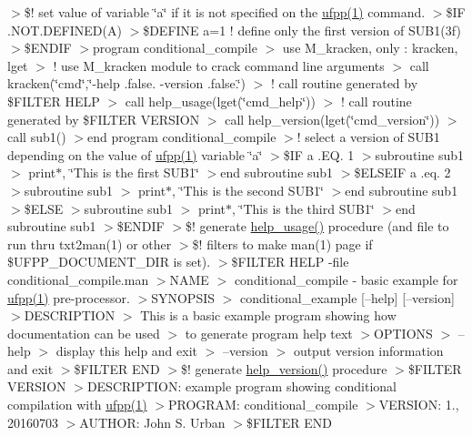 $>$\$! set value of variable \char`\"{}a\char`\"{} if it is not specified on the \hyperlink{ufpp__overview_81_8txt_a97c20a96bcab81bc74c9d64b001f1202}{ufpp(1)} command. $>$\$\+IF .N\+O\+T.\+D\+E\+F\+I\+N\+E\+D(\+A) $>$\$\+D\+E\+F\+I\+NE a=1 ! define only the first version of S\+U\+B1(3f) $>$\$\+E\+N\+D\+IF $>$program conditional\+\_\+compile $>$ use M\+\_\+kracken, only \+: kracken, lget $>$ ! use M\+\_\+kracken module to crack command line arguments $>$ call kracken(\char`\"{}cmd\char`\"{},\char`\"{}-\/help .\+false. -\/version .\+false.\char`\"{}) $>$ ! call routine generated by \$\+F\+I\+L\+T\+ER H\+E\+LP $>$ call help\+\_\+usage(lget(\char`\"{}cmd\+\_\+help\char`\"{})) $>$ ! call routine generated by \$\+F\+I\+L\+T\+ER V\+E\+R\+S\+I\+ON $>$ call help\+\_\+version(lget(\char`\"{}cmd\+\_\+version\char`\"{})) $>$ call sub1() $>$end program conditional\+\_\+compile $>$! select a version of S\+U\+B1 depending on the value of \hyperlink{ufpp__overview_81_8txt_a97c20a96bcab81bc74c9d64b001f1202}{ufpp(1)} variable \char`\"{}a\char`\"{} $>$\$\+IF a .EQ. 1 $>$subroutine sub1 $>$ print$\ast$, \char`\"{}\+This is the first S\+U\+B1\char`\"{} $>$end subroutine sub1 $>$\$\+E\+L\+S\+E\+IF a .eq. 2 $>$subroutine sub1 $>$ print$\ast$, \char`\"{}\+This is the second S\+U\+B1\char`\"{} $>$end subroutine sub1 $>$\$\+E\+L\+SE $>$subroutine sub1 $>$ print$\ast$, \char`\"{}\+This is the third S\+U\+B1\char`\"{} $>$end subroutine sub1 $>$\$\+E\+N\+D\+IF $>$\$! generate \hyperlink{namespacem__fpp_a17c5179799e6700fe39fb3bd2ec85d01}{help\+\_\+usage()} procedure (and file to run thru txt2man(1) or other $>$\$! filters to make man(1) page if \$\+U\+F\+P\+P\+\_\+\+D\+O\+C\+U\+M\+E\+N\+T\+\_\+\+D\+IR is set). $>$\$\+F\+I\+L\+T\+ER H\+E\+LP -\/file conditional\+\_\+compile.\+man $>$N\+A\+ME $>$ conditional\+\_\+compile -\/ basic example for \hyperlink{ufpp__overview_81_8txt_a97c20a96bcab81bc74c9d64b001f1202}{ufpp(1)} pre-\/processor. $>$S\+Y\+N\+O\+P\+S\+IS $>$ conditional\+\_\+example \mbox{[}--help\mbox{]} \mbox{[}--version\mbox{]} $>$D\+E\+S\+C\+R\+I\+P\+T\+I\+ON $>$ This is a basic example program showing how documentation can be used $>$ to generate program help text $>$O\+P\+T\+I\+O\+NS $>$ --help $>$ display this help and exit $>$ --version $>$ output version information and exit $>$\$\+F\+I\+L\+T\+ER E\+ND $>$\$! generate \hyperlink{namespacem__fpp_a7a571f61ee26c2a637c1530d2271ab23}{help\+\_\+version()} procedure $>$\$\+F\+I\+L\+T\+ER V\+E\+R\+S\+I\+ON $>$D\+E\+S\+C\+R\+I\+P\+T\+I\+ON\+: example program showing conditional compilation with \hyperlink{ufpp__overview_81_8txt_a97c20a96bcab81bc74c9d64b001f1202}{ufpp(1)} $>$P\+R\+O\+G\+R\+AM\+: conditional\+\_\+compile $>$V\+E\+R\+S\+I\+ON\+: 1., 20160703 $>$A\+U\+T\+H\+OR\+: John S. Urban $>$\$\+F\+I\+L\+T\+ER E\+ND 

